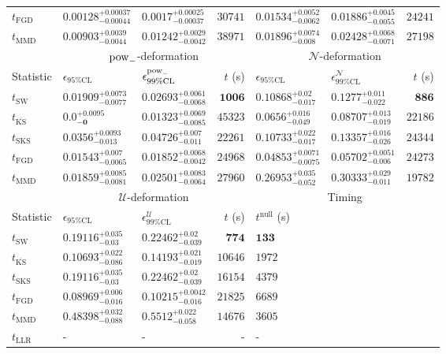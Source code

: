 \begin{tabular}{l|llr|llr}
	$t_{\mathrm{FGD}}$ & ${\mathbf{0.00128_{-0.00044}^{+0.00037}}}$ & ${\mathbf{0.0017_{-0.00037}^{+0.00025}}}$ & $30741$ & $0.01534_{-0.0062}^{+0.0052}$ & $0.01886_{-0.0055}^{+0.0045}$ & $24241$ \\
	$t_{\mathrm{MMD}}$ & $0.00903_{-0.0044}^{+0.0039}$ & $0.01242_{-0.0042}^{+0.0029}$ & $38971$ & $0.01896_{-0.008}^{+0.0074}$ & $0.02428_{-0.0071}^{+0.0068}$ & $27198$ \\
	\toprule
	\multicolumn{1}{c}{} & \multicolumn{3}{c}{$\rm{pow}_{-}$-deformation} & \multicolumn{3}{c}{$\mathcal{N}$-deformation} \\
	Statistic & $\epsilon_{95\%\mathrm{CL}}$ & $\epsilon^  {\rm{pow}_{-}}_{99\%\mathrm{CL}}$ & $t$ (s) & $\epsilon_{95\%\mathrm{CL}}$ & $\epsilon^    {\mathcal{N}}_{99\%\mathrm{CL}}$ & $t$ (s) \\
	\midrule
	$t_{\mathrm{SW}}$ & $0.01909_{-0.0077}^{+0.0073}$ & $0.02693_{-0.0068}^{+0.0061}$ & ${\mathbf{1006}}$ & $0.10868_{-0.017}^{+0.02}$ & $0.1277_{-0.022}^{+0.011}$ & ${\mathbf{886}}$ \\
	$t_{\overline{\mathrm{KS}}}$ & ${\mathbf{0.0_{-0}^{+0.0095}}}$ & ${\mathbf{0.01323_{-0.0085}^{+0.0069}}}$ & $45323$ & $0.0656_{-0.049}^{+0.016}$ & $0.08707_{-0.019}^{+0.013}$ & $22186$ \\
	$t_{\mathrm{SKS}}$ & $0.0356_{-0.013}^{+0.0093}$ & $0.04726_{-0.011}^{+0.007}$ & $22261$ & $0.10733_{-0.017}^{+0.022}$ & $0.13357_{-0.026}^{+0.016}$ & $24344$ \\
	$t_{\mathrm{FGD}}$ & $0.01543_{-0.0065}^{+0.007}$ & $0.01852_{-0.0042}^{+0.0068}$ & $24968$ & ${\mathbf{0.04853_{-0.0075}^{+0.0071}}}$ & ${\mathbf{0.05702_{-0.006}^{+0.0051}}}$ & $24273$ \\
	$t_{\mathrm{MMD}}$ & $0.01859_{-0.0081}^{+0.0085}$ & $0.02501_{-0.0064}^{+0.0083}$ & $27960$ & $0.26953_{-0.052}^{+0.035}$ & $0.30333_{-0.011}^{+0.029}$ & $19782$ \\
	\toprule
	\multicolumn{1}{c}{} & \multicolumn{3}{c}{$\mathcal{U}$-deformation} & \multicolumn{3}{c}{Timing} \\
	Statistic & $\epsilon_{95\%\mathrm{CL}}$ & $\epsilon^    {\mathcal{U}}_{99\%\mathrm{CL}}$ & $t$ (s) & $t^{\mathrm{null}}$ (s) \\
	\midrule
	$t_{\mathrm{SW}}$ & $0.19116_{-0.03}^{+0.035}$ & $0.22462_{-0.039}^{+0.02}$ & ${\mathbf{774}}$ & ${\mathbf{133}}$ \\
	$t_{\overline{\mathrm{KS}}}$ & $0.10693_{-0.086}^{+0.022}$ & $0.14193_{-0.019}^{+0.021}$ & $10646$ & $1972$ \\
	$t_{\mathrm{SKS}}$ & $0.19116_{-0.03}^{+0.035}$ & $0.22462_{-0.039}^{+0.02}$ & $16154$ & $4379$ \\
	$t_{\mathrm{FGD}}$ & ${\mathbf{0.08969_{-0.016}^{+0.006}}}$ & ${\mathbf{0.10215_{-0.016}^{+0.0042}}}$ & $21825$ & $6689$ \\
	$t_{\mathrm{MMD}}$ & $0.48398_{-0.088}^{+0.032}$ & $0.5512_{-0.058}^{+0.022}$ & $14676$ & $3605$ \\
	$t_{\mathrm{LLR}}$ & - & - & - & - \\
	\bottomrule
\end{tabular}